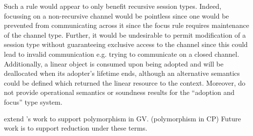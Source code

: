 Such a rule would appear to only benefit recursive session types. Indeed,
focussing on a non-recursive channel would be pointless since one would be
prevented from communicating across it since the focus rule requires
maintenance of the channel type. Further, it would be undesirable to permit
modification of a session type without guaranteeing exclusive access to the
channel since this could lead to invalid communication e.g. trying to
communicate on a closed channel. Additionally, a linear object is consumed
upon being adopted and will be deallocated when its adopter's lifetime ends,
although an alternative semantics could be defined which returned the linear
resource to the context. Moreover, \citeauthor{Fahndrich:2002} do not provide
operational semantics or soundness results for the ``adoption and focus'' type
system.

\citeauthor{??} extend \citeauthor{Wadler:2014}'s work to support polymorphism
in GV. (polymorphism in CP) Future work is to support reduction under these
terms.
